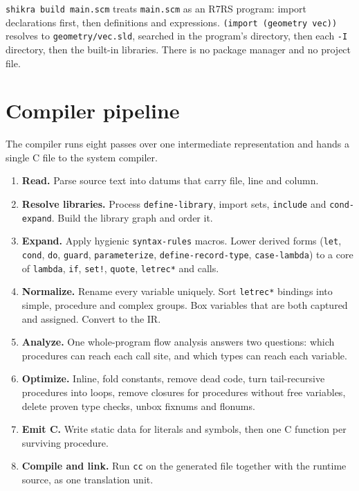 \documentclass[a4paper,11pt]{article}
\begin{document}
\texttt{shikra build main.scm} treats \texttt{main.scm} as an R7RS program:
import declarations first, then definitions and expressions.
\texttt{(import (geometry vec))} resolves to \texttt{geometry/vec.sld},
searched in the program's directory, then each \texttt{-I} directory, then
the built-in libraries. There is no package manager and no project file.

\section{Compiler pipeline}

The compiler runs eight passes over one intermediate representation and
hands a single C file to the system compiler.

\begin{enumerate}
\item \textbf{Read.} Parse source text into datums that carry file, line and
  column.
\item \textbf{Resolve libraries.} Process \texttt{define-library}, import
  sets, \texttt{include} and \texttt{cond-expand}. Build the library graph
  and order it.
\item \textbf{Expand.} Apply hygienic \texttt{syntax-rules} macros. Lower
  derived forms (\texttt{let}, \texttt{cond}, \texttt{do}, \texttt{guard},
  \texttt{parameterize}, \texttt{define-record-type}, \texttt{case-lambda})
  to a core of \texttt{lambda}, \texttt{if}, \texttt{set!}, \texttt{quote},
  \texttt{letrec*} and calls.
\item \textbf{Normalize.} Rename every variable uniquely. Sort
  \texttt{letrec*} bindings into simple, procedure and complex groups. Box
  variables that are both captured and assigned. Convert to the IR.
\item \textbf{Analyze.} One whole-program flow analysis answers two
  questions: which procedures can reach each call site, and which types can
  reach each variable.
\item \textbf{Optimize.} Inline, fold constants, remove dead code, turn
  tail-recursive procedures into loops, remove closures for procedures
  without free variables, delete proven type checks, unbox fixnums and
  flonums.
\item \textbf{Emit C.} Write static data for literals and symbols, then one
  C function per surviving procedure.
\item \textbf{Compile and link.} Run \texttt{cc} on the generated file
  together with the runtime source, as one translation unit.
\end{enumerate}
\end{document}
